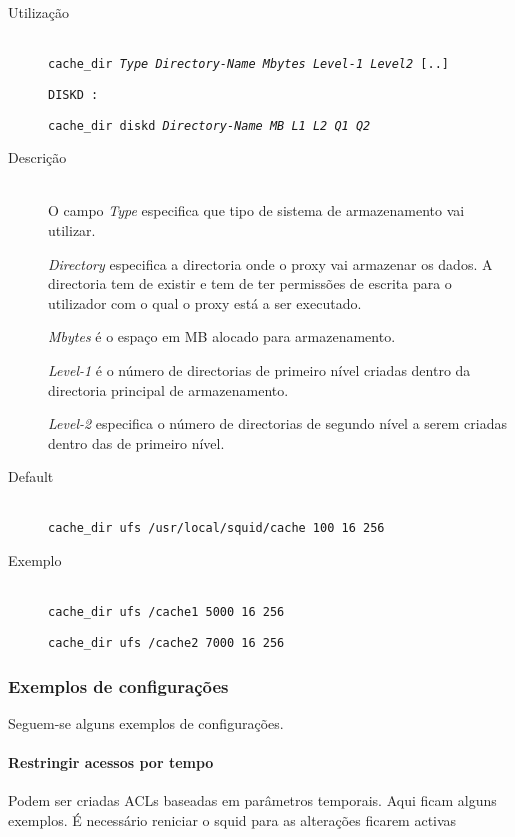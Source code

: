 
\begin{description}
\item[Utilização]~\\
\texttt{cache\_dir \emph{Type} \emph{Directory-Name} \emph{Mbytes}
\emph{Level-1} \emph{Level2} [..]}

\texttt{DISKD :}

\texttt{cache\_dir diskd \emph{Directory-Name} \emph{MB} \emph{L1}
\emph{L2} \emph{Q1} \emph{Q2}}

\item[Descrição]~\\
O campo \emph{Type} especifica que tipo de sistema de armazenamento vai
utilizar.

\emph{Directory} especifica a directoria onde o proxy vai armazenar os dados.
A directoria tem de existir e tem de ter permissões de escrita para o
utilizador com o qual o proxy está a ser executado.

\emph{Mbytes} é o espaço em MB alocado para armazenamento.

\emph{Level-1} é o número de directorias de primeiro nível criadas
dentro da directoria principal de armazenamento.

\emph{Level-2} especifica o número de directorias de segundo nível a
serem criadas dentro das de primeiro nível.

\item[Default]~\\
\texttt{cache\_dir ufs /usr/local/squid/cache 100 16 256}

\item[Exemplo]~\\
\texttt{cache\_dir ufs /cache1 5000 16 256}

\texttt{cache\_dir ufs /cache2 7000 16 256}
\end{description}

\subsubsection{Exemplos de configurações}

Seguem-se alguns exemplos de configurações.

\paragraph{Restringir acessos por tempo}

Podem ser criadas ACLs baseadas em parâmetros temporais.
Aqui ficam alguns exemplos.
É necessário reniciar o squid para as alterações ficarem
activas


